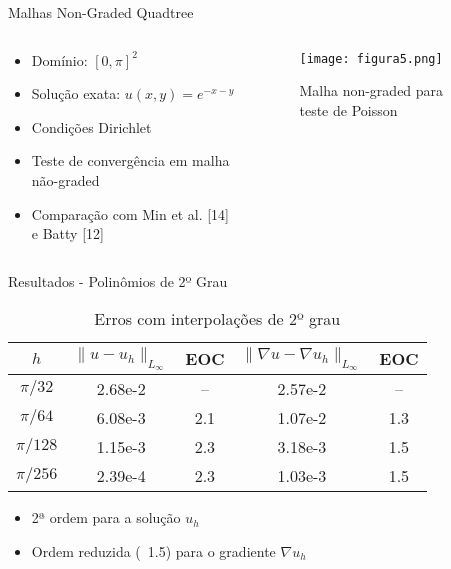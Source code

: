 \documentclass[../main/main.tex]{subfiles}
\begin{document}
\begin{frame}{Malhas Non-Graded Quadtree}
\begin{columns}[T]
\begin{column}{0.5\textwidth}
\begin{itemize}
\item Domínio: $[0, \pi]^2$
\item Solução exata: $u(x, y) = e^{-x-y}$
\item Condições Dirichlet
\item Teste de convergência em malha não-graded
\item Comparação com Min et al. [14] e Batty [12]
\end{itemize}
\end{column}
\begin{column}{0.5\textwidth}
\begin{figure}
\centering
\texttt{[image: figura5.png]}
\caption{Malha non-graded para teste de Poisson}
\end{figure}
\end{column}
\end{columns}
\end{frame}

\begin{frame}{Resultados - Polinômios de 2º Grau}
\begin{table}
\centering
\caption{Erros com interpolações de 2º grau}
\begin{tabular}{ccccc}
\toprule
$h$ & $\|u-u_h\|_{L_\infty}$ & EOC & $\|\nabla u-\nabla u_h\|_{L_\infty}$ & EOC \\
\midrule
$\pi/32$ & 2.68e-2 & -- & 2.57e-2 & -- \\
$\pi/64$ & 6.08e-3 & 2.1 & 1.07e-2 & 1.3 \\
$\pi/128$ & 1.15e-3 & 2.3 & 3.18e-3 & 1.5 \\
$\pi/256$ & 2.39e-4 & 2.3 & 1.03e-3 & 1.5 \\
\bottomrule
\end{tabular}
\end{table}

\begin{itemize}
\item 2ª ordem para a solução $u_h$
\item Ordem reduzida (~1.5) para o gradiente $\nabla u_h$
\end{itemize}
\end{frame}
\end{document}
